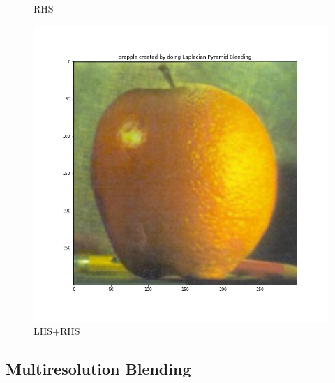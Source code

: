 \documentclass{article}
\begin{document}
\begin{figure}[!htb]
    \caption{RHS}
\endminipage
{}
    \includegraphics[width=\linewidth]{orapple.png}
    \caption{LHS+RHS}
\endminipage
\end{figure}
\FloatBarrier

\subsection{Multiresolution Blending}
\end{document}
